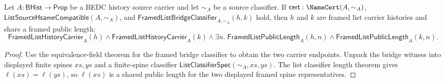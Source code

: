 \begin{theorem}
\label{thm:list-framed-bridge-classifier-public-length-total}
Let $A:\mathsf{BHist}\to\mathsf{Prop}$ be a BEDC history source carrier and let
$\sim_A$ be a source classifier. If $\mathsf{cert}:\NameCert(A,\sim_A)$,
$\mathsf{ListSourceHsameCompatible}(A,\sim_A)$, and
$\mathsf{FramedListBridgeClassifier}_{A,\sim_A}(h,k)$ hold, then $h$ and $k$
are framed list carrier histories and share a framed public length:
$$
\mathsf{FramedListHistoryCarrier}_A(h)\land
\mathsf{FramedListHistoryCarrier}_A(k)
\land
\exists n.\;
\mathsf{FramedListPublicLength}_A(h,n)\land
\mathsf{FramedListPublicLength}_A(k,n).
$$
\end{theorem}
\begin{proof}
Use the equivalence-field theorem for the framed bridge classifier to obtain
the two carrier endpoints. Unpack the bridge witness into displayed finite
spines $xs,ys$ and a finite-spine classifier
$\mathsf{ListClassifierSpec}(\sim_A,xs,ys)$. The list classifier length theorem
gives $\ell(xs)=\ell(ys)$, so $\ell(xs)$ is a shared public length for the two
displayed framed spine representatives.
\end{proof}

